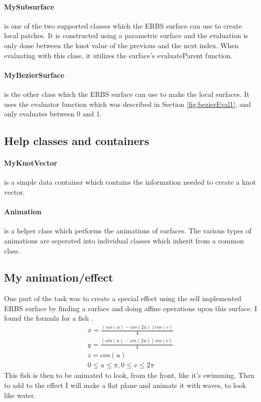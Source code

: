 \documentclass[a4paper,11pt]{article}
\begin{document}
\paragraph{MySubsurface}
is one of the two supported classes which the ERBS surface can use to create local patches. It is constructed using a parametric surface and the evaluation is only done between the knot value of the previous and the next index. When evaluating with this class, it utilizes the surface's evaluateParent function. 

\paragraph{MyBezierSurface}
is the other class which the ERBS surface can use to make the local surfaces. It uses the evaluator function which was described in Section \ref{fig:bezierEval1}, and only evaluates between 0 and 1. 

\subsection{Help classes and containers}
\paragraph{MyKnotVector}
is a simple data container which contains the information needed to create a knot vector. 

\paragraph{Animation}
is a helper class which performs the animations of surfaces. The various types of animations are seperated into individual classes which inherit from a common class. 

\subsection{My animation/effect}
One part of the task was to create a special effect using the self implemented ERBS surface by finding a surface and doing affine operations upon this surface. I found the formula for a fish \cite{web_fish}.
\begin{equation}
\begin{split}
 x = \frac{(cos(u) - cos(2u))cos(v)}{4} \\
 y = \frac{(sin(u) - sin(2u))sin(v)}{4} \\
 z = cos(u) \\
 0 \leq u \leq \pi, 0 \leq v \leq 2\pi
\end{split}
\end{equation}
This fish is then to be animated to look, from the front, like it's swimming. Then to add to the effect I will make a flat plane and animate it with waves, to look like water. 
\end{document}
